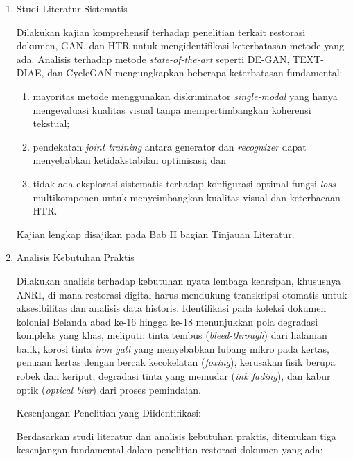 
\begin{enumerate}[label=\arabic*., leftmargin=*, nosep]
    \item Studi Literatur Sistematis

          Dilakukan kajian komprehensif terhadap penelitian terkait restorasi dokumen, GAN, dan HTR untuk mengidentifikasi keterbatasan metode yang ada. Analisis terhadap metode \textit{state-of-the-art} seperti DE-GAN, TEXT-DIAE, dan CycleGAN mengungkapkan beberapa keterbatasan fundamental:
          \begin{enumerate}[label=(\arabic*), leftmargin=*, nosep]
              \item mayoritas metode menggunakan diskriminator \textit{single-modal} yang hanya mengevaluasi kualitas visual tanpa mempertimbangkan koherensi tekstual;
              \item pendekatan \textit{joint training} antara generator dan \textit{recognizer} dapat menyebabkan ketidakstabilan optimisasi; dan
              \item tidak ada eksplorasi sistematis terhadap konfigurasi optimal fungsi \textit{loss} multikomponen untuk menyeimbangkan kualitas visual dan keterbacaan HTR.
          \end{enumerate}
          Kajian lengkap disajikan pada Bab II bagian Tinjauan Literatur.

    \item Analisis Kebutuhan Praktis

          Dilakukan analisis terhadap kebutuhan nyata lembaga kearsipan, khususnya ANRI, di mana restorasi digital harus mendukung transkripsi otomatis untuk aksesibilitas dan analisis data historis. Identifikasi pada koleksi dokumen kolonial Belanda abad ke-16 hingga ke-18 menunjukkan pola degradasi kompleks yang khas, meliputi: tinta tembus (\textit{bleed-through}) dari halaman balik, korosi tinta \textit{iron gall} yang menyebabkan lubang mikro pada kertas, penuaan kertas dengan bercak kecokelatan (\textit{foxing}), kerusakan fisik berupa robek dan keriput, degradasi tinta yang memudar (\textit{ink fading}), dan kabur optik (\textit{optical blur}) dari proses pemindaian.

          Kesenjangan Penelitian yang Diidentifikasi:

          Berdasarkan studi literatur dan analisis kebutuhan praktis, ditemukan tiga kesenjangan fundamental dalam penelitian restorasi dokumen yang ada:


\end{enumerate}
